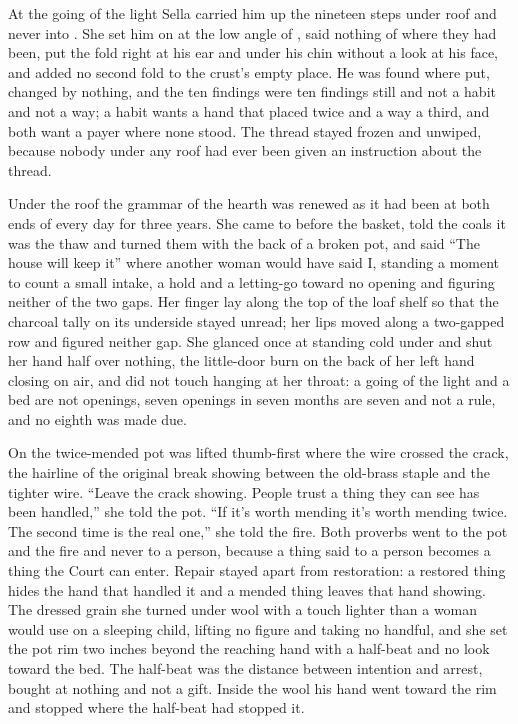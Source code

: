 \scenebreak

At the going of the light Sella carried him up the nineteen steps under  roof and never into . She set him on  at the low angle of , said nothing of where they had been, put the fold right at his ear and under his chin without a look at his face, and added no second fold to the crust's empty place. He was found where put, changed by nothing, and the ten findings were ten findings still and not a habit and not a way; a habit wants a hand that placed twice and a way a third, and both want a payer where none stood. The thread stayed frozen and unwiped, because nobody under any roof had ever been given an instruction about the thread.

Under the roof the grammar of the hearth was renewed as it had been at both ends of every day for three years. She came to  before the basket, told the coals it was the thaw and turned them with the back of a broken pot, and said “The house will keep it” where another woman would have said I, standing a moment to count a small intake, a hold and a letting-go toward no opening and figuring neither of the two gaps. Her finger lay along the top of the loaf shelf so that the charcoal tally on its underside stayed unread; her lips moved along a two-gapped row and figured neither gap. She glanced once at  standing cold under  and shut her hand half over nothing, the little-door burn on the back of her left hand closing on air, and did not touch  hanging at her throat: a going of the light and a bed are not openings, seven openings in seven months are seven and not a rule, and no eighth was made due.

On  the twice-mended pot was lifted thumb-first where the wire crossed the crack, the hairline of the original break showing between the old-brass staple and the tighter wire. “Leave the crack showing. People trust a thing they can see has been handled,” she told the pot. “If it's worth mending it's worth mending twice. The second time is the real one,” she told the fire. Both proverbs went to the pot and the fire and never to a person, because a thing said to a person becomes a thing the Court can enter. Repair stayed apart from restoration: a restored thing hides the hand that handled it and a mended thing leaves that hand showing. The dressed grain she turned under wool with a touch lighter than a woman would use on a sleeping child, lifting no figure and taking no handful, and she set the pot rim two inches beyond the reaching hand with a half-beat and no look toward the bed. The half-beat was the distance between intention and arrest, bought at nothing and not a gift. Inside the wool his hand went toward the rim and stopped where the half-beat had stopped it.

